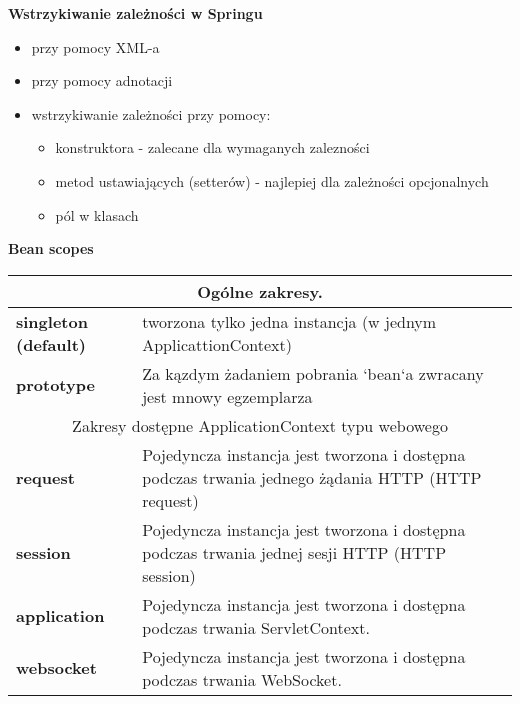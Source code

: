 \documentclass[../main.tex]{subfiles}
\begin{document}
    \textbf{Wstrzykiwanie zależności w Springu}
    \begin{itemize}
        \item przy pomocy XML-a
        \item przy pomocy adnotacji
        \item wstrzykiwanie zależności przy pomocy:
        \begin{itemize}
            \item konstruktora - zalecane dla wymaganych zalezności
            \item metod ustawiających (setterów) - najlepiej dla zależności opcjonalnych
            \item pól w klasach
        \end{itemize}
    \end{itemize}

    \textbf{Bean scopes}
    \begin{table}[H]
        \begin{center}
            \begin{tabular}{| p{4cm} | p{10cm} |}
                \hline
                \multicolumn{2}{|c|}{Ogólne zakresy.}\\
                \hline
                \textbf{singleton (default)} &
                tworzona tylko jedna instancja (w jednym ApplicattionContext)\\
                \hline
                \textbf{prototype} & Za kązdym żadaniem pobrania `bean`a zwracany jest
                mnowy egzemplarza\\
                \hline
                \hline
                \multicolumn{2}{|c|}{Zakresy dostępne ApplicationContext typu webowego}\\
                \hline
                \textbf{request} & Pojedyncza instancja jest tworzona i dostępna podczas
                trwania jednego żądania HTTP (HTTP request)\\
                \hline
                \textbf{session} & Pojedyncza instancja jest tworzona i dostępna podczas
                trwania jednej sesji HTTP (HTTP session)\\
                \hline
                \textbf{application} & Pojedyncza instancja jest tworzona i dostępna podczas
                trwania ServletContext.\\
                \hline
                \textbf{websocket} & Pojedyncza instancja jest tworzona i dostępna podczas
                trwania WebSocket.\\
                \hline
            \end{tabular}
        \end{center}
    \end{table}
\end{document}
